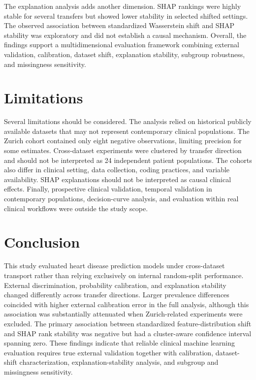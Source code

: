 \documentclass[10pt,journal,twocolumn]{IEEEtran}
\begin{document}
The explanation analysis adds another dimension. SHAP rankings were highly stable for several transfers but showed lower stability in selected shifted settings. The observed association between standardized Wasserstein shift and SHAP stability was exploratory and did not establish a causal mechanism. Overall, the findings support a multidimensional evaluation framework combining external validation, calibration, dataset shift, explanation stability, subgroup robustness, and missingness sensitivity.


\section{Limitations}

Several limitations should be considered. The analysis relied on historical publicly available datasets that may not represent contemporary clinical populations. The Zurich cohort contained only eight negative observations, limiting precision for some estimates. Cross-dataset experiments were clustered by transfer direction and should not be interpreted as 24 independent patient populations. The cohorts also differ in clinical setting, data collection, coding practices, and variable availability. SHAP explanations should not be interpreted as causal clinical effects. Finally, prospective clinical validation, temporal validation in contemporary populations, decision-curve analysis, and evaluation within real clinical workflows were outside the study scope.


\section{Conclusion}

This study evaluated heart disease prediction models under cross-dataset transport rather than relying exclusively on internal random-split performance. External discrimination, probability calibration, and explanation stability changed differently across transfer directions. Larger prevalence differences coincided with higher external calibration error in the full analysis, although this association was substantially attenuated when Zurich-related experiments were excluded. The primary association between standardized feature-distribution shift and SHAP rank stability was negative but had a cluster-aware confidence interval spanning zero. These findings indicate that reliable clinical machine learning evaluation requires true external validation together with calibration, dataset-shift characterization, explanation-stability analysis, and subgroup and missingness sensitivity.
\end{document}
